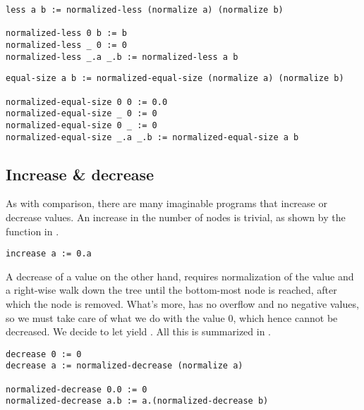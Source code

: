 \begin{lstlisting}[label=listing:less,
  caption={The function \mono{less/2} yields true if the first argument 
    is less than the second and false otherwise.}]
less a b := normalized-less (normalize a) (normalize b)

normalized-less 0 b := b
normalized-less _ 0 := 0
normalized-less _.a _.b := normalized-less a b
\end{lstlisting}

\begin{lstlisting}[label=listing:equal-size,
  caption={The function \mono{equal-size/2} function.}]
equal-size a b := normalized-equal-size (normalize a) (normalize b)

normalized-equal-size 0 0 := 0.0
normalized-equal-size _ 0 := 0
normalized-equal-size 0 _ := 0
normalized-equal-size _.a _.b := normalized-equal-size a b
\end{lstlisting}

\subsection{Increase \& decrease}

As with comparison, there are many imaginable programs that increase or
decrease values. An increase in the number of nodes is trivial, as shown by the
function  in . 

\begin{lstlisting}[label=listing:increase,
  caption={The function \mono{increase/1} increases a value by 1.}]
increase a := 0.a
\end{lstlisting}

A decrease of a value on the other hand, requires normalization of the value
and a right-wise walk down the tree until the bottom-most node is reached,
after which the node is removed.  What's more, \D{} has no overflow and no
negative values, so we must take care of what we do with the value $0$, which
hence cannot be decreased. We decide to let  yield .
All this is summarized in .

\begin{lstlisting}[label=listing:decrease,
  caption={The function \mono{decrease/1} decreases a value 1,
    unless that value is 0, in which case nothing is done.}]
decrease 0 := 0
decrease a := normalized-decrease (normalize a)

normalized-decrease 0.0 := 0
normalized-decrease a.b := a.(normalized-decrease b)
\end{lstlisting}

